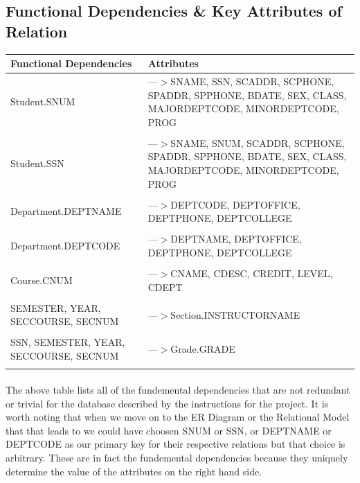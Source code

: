 \documentclass[12pt]{article}
\begin{document}
		\subsection{Functional Dependencies \& Key Attributes of Relation}
			\footnotesize{
				\begin{flushleft}
					\begin{tabular}{m{15em}|m{27.5em}} 
						\textbf{Functional Dependencies} & \textbf{Attributes} \\
						\hline
						\multirow{1}{15em}{Student.SNUM} 
						& ---$>$SNAME, SSN, SCADDR, SCPHONE, SPADDR, SPPHONE, BDATE, SEX, CLASS, MAJORDEPTCODE, MINORDEPTCODE, PROG\\
						&\\
						\hline
						\multirow{1}{15em}{Student.SSN} 
						& ---$>$SNAME, SNUM, SCADDR, SCPHONE, SPADDR, SPPHONE, BDATE, SEX, CLASS, MAJORDEPTCODE, MINORDEPTCODE, PROG\\
						&\\
						\hline
						\multirow{1}{15em}{Department.DEPTNAME} 
						& ---$>$DEPTCODE, DEPTOFFICE, DEPTPHONE, DEPTCOLLEGE\\
						&\\
						\hline
						\multirow{1}{15em}{Department.DEPTCODE} 
						& ---$>$DEPTNAME, DEPTOFFICE, DEPTPHONE, DEPTCOLLEGE\\
						&\\
						\hline
						\multirow{1}{15em}{Course.CNUM} 
						& ---$>$CNAME, CDESC, CREDIT, LEVEL, CDEPT\\
						&\\
						\hline
						\multirow{1}{15em}{SEMESTER, YEAR, SECCOURSE, SECNUM} 
						& ---$>$Section.INSTRUCTORNAME\\
						&\\
						\hline
						\multirow{1}{15em}{SSN, SEMESTER, YEAR, SECCOURSE, SECNUM} 
						& ---$>$Grade.GRADE\\
						&\\
					\end{tabular}
				\end{flushleft}
			}

			\paragraph{}
				The above table lists all of the fundemental dependencies that are not redundant or trivial for the database described by the instructions for the project. It is worth noting that when we move on to the ER Diagram or the Relational Model that that leads to we could have choosen SNUM or SSN, or DEPTNAME or DEPTCODE as our primary key for their respective relations but that choice is arbitrary. These are in fact the fundemental dependencies because they uniquely determine the value of the attributes on the right hand side.
\end{document}
